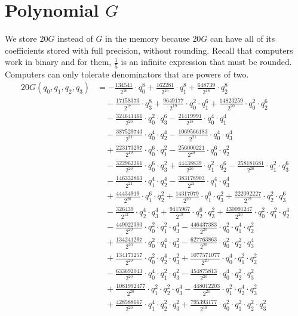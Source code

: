 \section{Polynomial $G$}
We store $20G$ instead of $G$ in the memory because $20G$ can have all of its coefficients stored with full precision, without rounding. Recall that computers work in binary and for them, $\frac15$ is an infinite expression that must be rounded. Computers can only tolerate denominators that are powers of two.
\begin{align*}20G(q_0,q_1,q_2,q_3)&=-\frac{134541}{2^{10}}\cdot q_0^{8}+\frac{162281}{2^{16}}\cdot q_1^{8}+\frac{648739}{2^{18}}\cdot q_2^{8}\\
&\quad -\frac{17158373}{2^{17}}\cdot q_3^{8}+\frac{9649177}{2^{19}}\cdot q_0^{2}\cdot q_1^{6}+\frac{14823259}{2^{20}}\cdot q_0^{2}\cdot q_2^{6}\\
&\quad -\frac{324641461}{2^{20}}\cdot q_0^{2}\cdot q_3^{6}-\frac{21419991}{2^{18}}\cdot q_0^{4}\cdot q_1^{4}\\
&\quad -\frac{387529743}{2^{21}}\cdot q_0^{4}\cdot q_2^{4}-\frac{1069566183}{2^{21}}\cdot q_0^{4}\cdot q_3^{4}\\
&\quad +\frac{223173297}{2^{19}}\cdot q_0^{6}\cdot q_1^{2}-\frac{256000221}{2^{20}}\cdot q_0^{6}\cdot q_2^{2}\\
&\quad -\frac{322962261}{2^{20}}\cdot q_0^{6}\cdot q_3^{2}+\frac{44438839}{2^{20}}\cdot q_1^{2}\cdot q_2^{6}-\frac{258181681}{2^{20}}\cdot q_1^{2}\cdot q_3^{6}\\
&\quad -\frac{146332863}{2^{21}}\cdot q_1^{4}\cdot q_2^{4}-\frac{383178903}{2^{21}}\cdot q_1^{4}\cdot q_3^{4}\\
&\quad +\frac{44434919}{2^{20}}\cdot q_1^{6}\cdot q_2^{2}+\frac{14317079}{2^{20}}\cdot q_1^{6}\cdot q_3^{2}+\frac{222092227}{2^{19}}\cdot q_2^{2}\cdot q_3^{6}\\
&\quad -\frac{326439}{2^{12}}\cdot q_2^{4}\cdot q_3^{4}+\frac{9415967}{2^{19}}\cdot q_2^{6}\cdot q_3^{2}+\frac{430091247}{2^{20}}\cdot q_0^{2}\cdot q_1^{2}\cdot q_2^{4}\\
&\quad -\frac{449022393}{2^{20}}\cdot q_0^{2}\cdot q_1^{2}\cdot q_3^{4}-\frac{446437383}{2^{20}}\cdot q_0^{2}\cdot q_1^{4}\cdot q_2^{2}\\
&\quad +\frac{134241297}{2^{20}}\cdot q_0^{2}\cdot q_1^{4}\cdot q_3^{2}-\frac{627763863}{2^{20}}\cdot q_0^{2}\cdot q_2^{2}\cdot q_3^{4}\\
&\quad +\frac{134173257}{2^{20}}\cdot q_0^{2}\cdot q_2^{4}\cdot q_3^{2}+\frac{1077571077}{2^{20}}\cdot q_0^{4}\cdot q_1^{2}\cdot q_2^{2}\\
&\quad -\frac{633692043}{2^{20}}\cdot q_0^{4}\cdot q_1^{2}\cdot q_3^{2}-\frac{454875813}{2^{20}}\cdot q_0^{4}\cdot q_2^{2}\cdot q_3^{2}\\
&\quad +\frac{1081992477}{2^{20}}\cdot q_1^{2}\cdot q_2^{2}\cdot q_3^{4}-\frac{448012203}{2^{20}}\cdot q_1^{2}\cdot q_2^{4}\cdot q_3^{2}\\
&\quad +\frac{428588667}{2^{20}}\cdot q_1^{4}\cdot q_2^{2}\cdot q_3^{2}+\frac{795393177}{2^{19}}\cdot q_0^{2}\cdot q_1^{2}\cdot q_2^{2}\cdot q_3^{2}\end{align*}
